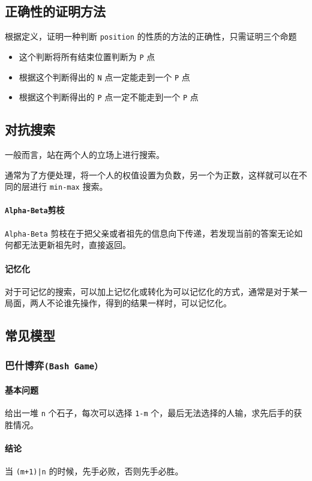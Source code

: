 \documentclass[UTF-8]{ctexart}
\begin{document}
	\subsection{正确性的证明方法}
	
	根据定义，证明一种判断 \texttt{position} 的性质的方法的正确性，只需证明三个命题
	
	\begin{itemize}
		\item 这个判断将所有结束位置判断为 \texttt{P} 点
		\item 根据这个判断得出的 \texttt{N} 点一定能走到一个 \texttt{P} 点
		\item 根据这个判断得出的 \texttt{P} 点一定不能走到一个 \texttt{P} 点
	\end{itemize}
	\subsection{对抗搜索}
	一般而言，站在两个人的立场上进行搜索。
	
	通常为了方便处理，将一个人的权值设置为负数，另一个为正数，这样就可以在不同的层进行 \texttt{min-max} 搜索。
	
	\paragraph{\texttt{Alpha-Beta}剪枝} \texttt{Alpha-Beta} 剪枝在于把父亲或者祖先的信息向下传递，若发现当前的答案无论如何都无法更新祖先时，直接返回。
	\paragraph{记忆化}对于可记忆的搜索，可以加上记忆化或转化为可以记忆化的方式，通常是对于某一局面，两人不论谁先操作，得到的结果一样时，可以记忆化。
	\subsection{常见模型}
	
	\subsubsection{巴什博弈\texttt{(Bash Game）}}
	\paragraph{基本问题} 给出一堆 \texttt{n} 个石子，每次可以选择 \texttt{1-m} 个，最后无法选择的人输，求先后手的获胜情况。
	\paragraph{结论} 当 \texttt{(m+1)|n} 的时候，先手必败，否则先手必胜。
\end{document}
